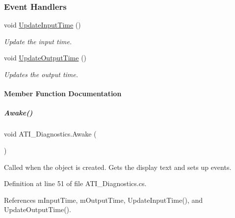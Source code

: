 \subsubsection*{Event Handlers}
\begin{DoxyCompactItemize}
\item 
void \hyperlink{group___audio_testing_afcdfad4dc61b1f22a6efcef738897515}{Update\+Input\+Time} ()
\begin{DoxyCompactList}\small\item\em Update the input time. \end{DoxyCompactList}\item 
void \hyperlink{group___audio_testing_ac172cf129d078d8b0e979bc17d11c5a0}{Update\+Output\+Time} ()
\begin{DoxyCompactList}\small\item\em Updates the output time. \end{DoxyCompactList}\end{DoxyCompactItemize}


\paragraph{Member Function Documentation}
\mbox{\label{group___audio_testing_a41cd250c9f5eea98dec6f32f49aa727f}} 
\subparagraph{\texorpdfstring{Awake()}{Awake()}}
{\footnotesize\ttfamily void A\+T\+I\+\_\+\+Diagnostics.\+Awake (\begin{DoxyParamCaption}{ }\end{DoxyParamCaption})\hspace{0.3cm}{\ttfamily [private]}}



Called when the object is created. Gets the display text and sets up events. 



Definition at line 51 of file A\+T\+I\+\_\+\+Diagnostics.\+cs.



References m\+Input\+Time, m\+Output\+Time, Update\+Input\+Time(), and Update\+Output\+Time().


